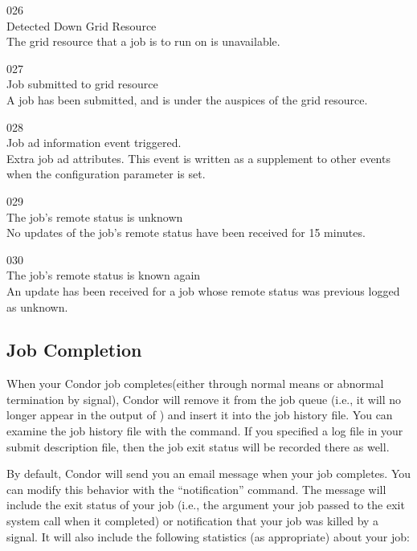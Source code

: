 \noindent{} 026 \\
 Detected Down Grid Resource \\
 The grid resource that a job is to
run on is unavailable.

\noindent{} 027 \\
 Job submitted to grid resource \\
 A job has been submitted,
and is under the auspices of the grid resource.

\noindent{} 028 \\
 Job ad information event triggered. \\
 Extra job ad attributes. This event is
written as a supplement to other events when the configuration
parameter  is set.

\noindent{} 029 \\
 The job's remote status is unknown \\
 No updates of the job's remote status
have been received for 15 minutes.

\noindent{} 030 \\
 The job's remote status is known again \\
 An update has been received for a job whose
remote status was previous logged as unknown.

\subsection{\label{sec:job-completion}Job Completion}

When your Condor job completes(either through normal means or abnormal
termination by signal), Condor will remove it from the job queue (i.e.,
it will no longer appear in the output of ) and insert it into
the job history file.  You can examine the job history file with the
 command. If you specified a log file in your submit
description file, then the job exit status will be recorded there as well.

By default, Condor will send you an email message
when your job completes.  You can modify this behavior with the
 ``notification'' command.
The message will include the exit status of your job (i.e., the
argument your job passed to the exit system call when it completed) or
notification that your job was killed by a signal.  It will also
include the following statistics (as appropriate) about your job:

